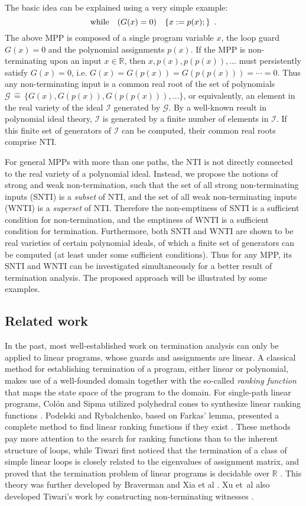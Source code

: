 \documentclass{jssc}
\newcommand{\while}{{\rm while}}
\newcommand{\I}{\mathcal{I}}
\newcommand{\define}{\hat{=}}
\begin{document}
The basic idea can be explained using a very simple example:
\[
\while \quad (G(x)=0) \quad \{x:=p(x);\} \enspace .
\]
The above MPP is composed of a single program variable $x$, the loop guard $G(x)=0$ and the polynomial assignments $p(x)$. If the MPP is non-terminating upon an input $x \in \mathbb{R}$, then $x,p(x),p(p(x)),\ldots$ must persistently satisfy $G(x)=0$, i.e. $G(x)=G(p(x))=G(p(p(x)))=\cdots=0$. Thus any non-terminating input is a common real root of the set of polynomials $\mathcal{G}\,\define\,\{G(x),G(p(x)),G(p(p(x))),\ldots\}$, or equivalently, an element in the real variety of the ideal $\I$ generated by $\mathcal{G}$. By a well-known result in polynomial ideal theory, $\I$ is generated by a finite number of elements in $\I$. If this finite set of generators of $\I$ can be computed, their common real roots comprise NTI.

For general MPPs with more than one paths, the NTI is not directly connected to the real variety of a polynomial ideal. Instead, we propose the notions of strong and weak non-termination, such that the set of all strong non-terminating inputs (SNTI) is a \emph{subset} of NTI, and the set of all weak non-terminating inputs (WNTI) is a \emph{superset} of NTI. Therefore the non-emptiness of SNTI is a sufficient condition for non-termination, and the emptiness of WNTI is a sufficient condition for termination. Furthermore, both SNTI and WNTI are shown to be real varieties of certain polynomial ideals, of which a finite set of generators can be computed (at least under some sufficient conditions). Thus for any MPP, its SNTI and WNTI can be investigated simultaneously for a better result of termination analysis. The proposed approach will be illustrated by some examples.

\subsection{Related work}
In the past, most well-established work on termination analysis can only be applied to linear programs, whose guards and assignments are linear. A classical method for establishing termination of a program, either linear or polynomial, makes use of a well-founded domain together with the so-called \emph{ranking function} that maps the state space of the program to the domain. For single-path linear programs, Col\'{o}n and Sipma utilized polyhedral cones to synthesize linear ranking functions \cite{colon:synthesis}. Podelski and Rybalchenko, based on Farkas' lemma, presented a complete method to find linear ranking functions if they exist \cite{podelski:ranking}. These methods pay more attention to the search for ranking functions than to the inherent structure of loops, while Tiwari first noticed that the termination of a class of simple linear loops is closely related to the eigenvalues of assignment matrix, and proved that the termination problem of linear programs is decidable over $\mathbb{R}$ \cite{tiwari:terminate}. This theory was further developed by Braverman \cite{braverman:terminate} and Xia et al \cite{XZ2010,XYZZ2011}. Xu et~al also developed Tiwari's work by constructing non-terminating witnesses \cite{xu:terminate,XuL13}.
\end{document}
